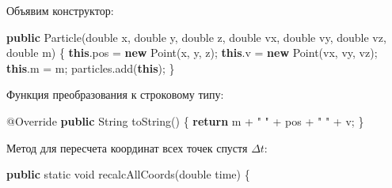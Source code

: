 \documentclass[
  12pt,
  a4paper,
]{article}
\newenvironment{Shaded}{}{}
\newcommand{\AttributeTok}[1]{\textcolor[rgb]{0.49,0.56,0.16}{#1}}
\newcommand{\BuiltInTok}[1]{#1}
\newcommand{\ControlFlowTok}[1]{\textcolor[rgb]{0.00,0.44,0.13}{\textbf{#1}}}
\newcommand{\DataTypeTok}[1]{\textcolor[rgb]{0.56,0.13,0.00}{#1}}
\newcommand{\FunctionTok}[1]{\textcolor[rgb]{0.02,0.16,0.49}{#1}}
\newcommand{\KeywordTok}[1]{\textcolor[rgb]{0.00,0.44,0.13}{\textbf{#1}}}
\newcommand{\NormalTok}[1]{#1}
\newcommand{\OperatorTok}[1]{\textcolor[rgb]{0.40,0.40,0.40}{#1}}
\newcommand{\StringTok}[1]{\textcolor[rgb]{0.25,0.44,0.63}{#1}}
\begin{document}
Объявим конструктор:

\begin{Shaded}
\begin{Highlighting}[]
\KeywordTok{public} \FunctionTok{Particle}\OperatorTok{(}\DataTypeTok{double}\NormalTok{ x}\OperatorTok{,} \DataTypeTok{double}\NormalTok{ y}\OperatorTok{,} \DataTypeTok{double}\NormalTok{ z}\OperatorTok{,} \DataTypeTok{double}\NormalTok{ vx}\OperatorTok{,} \DataTypeTok{double}\NormalTok{ vy}\OperatorTok{,} \DataTypeTok{double}\NormalTok{ vz}\OperatorTok{,} \DataTypeTok{double}\NormalTok{ m}\OperatorTok{)} \OperatorTok{\{}
    \KeywordTok{this}\OperatorTok{.}\FunctionTok{pos} \OperatorTok{=} \KeywordTok{new} \BuiltInTok{Point}\OperatorTok{(}\NormalTok{x}\OperatorTok{,}\NormalTok{ y}\OperatorTok{,}\NormalTok{ z}\OperatorTok{);}
    \KeywordTok{this}\OperatorTok{.}\FunctionTok{v} \OperatorTok{=} \KeywordTok{new} \BuiltInTok{Point}\OperatorTok{(}\NormalTok{vx}\OperatorTok{,}\NormalTok{ vy}\OperatorTok{,}\NormalTok{ vz}\OperatorTok{);}
    \KeywordTok{this}\OperatorTok{.}\FunctionTok{m} \OperatorTok{=}\NormalTok{ m}\OperatorTok{;}
\NormalTok{    particles}\OperatorTok{.}\FunctionTok{add}\OperatorTok{(}\KeywordTok{this}\OperatorTok{);}
\OperatorTok{\}}
\end{Highlighting}
\end{Shaded}

Функция преобразования к строковому типу:

\begin{Shaded}
\begin{Highlighting}[]
\AttributeTok{@Override}
\KeywordTok{public} \BuiltInTok{String} \FunctionTok{toString}\OperatorTok{()} \OperatorTok{\{}
    \ControlFlowTok{return}\NormalTok{ m }\OperatorTok{+} \StringTok{" "} \OperatorTok{+}\NormalTok{ pos }\OperatorTok{+} \StringTok{" "} \OperatorTok{+}\NormalTok{ v}\OperatorTok{;}
\OperatorTok{\}}
\end{Highlighting}
\end{Shaded}

Метод для пересчета координат всех точек спустя \(\Delta t\):

\begin{Shaded}
\begin{Highlighting}[]
\KeywordTok{public} \DataTypeTok{static} \DataTypeTok{void} \FunctionTok{recalcAllCoords}\OperatorTok{(}\DataTypeTok{double}\NormalTok{ time}\OperatorTok{)} \OperatorTok{\{}
\end{Highlighting}
\end{Shaded}
\end{document}
